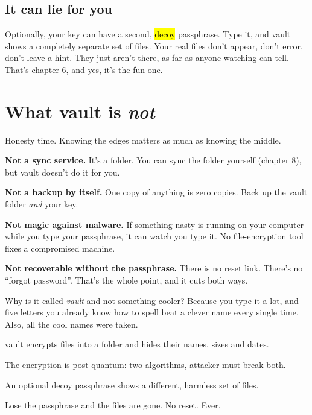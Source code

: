 \documentclass[10pt,oneside,openany]{book}
\begin{document}
\subsection{It can lie for you}
Optionally, your key can have a second, \hl{decoy} passphrase. Type it, and
vault shows a completely separate set of files. Your real files don't appear,
don't error, don't leave a hint. They just aren't there, as far as anyone
watching can tell. That's chapter 6, and yes, it's the fun one.

\section{What vault is \emph{not}}

Honesty time. Knowing the edges matters as much as knowing the middle.

\begin{nopes}
  \item \textbf{Not a sync service.} It's a folder. You can sync the folder
        yourself (chapter 8), but vault doesn't do it for you.
  \item \textbf{Not a backup by itself.} One copy of anything is zero copies.
        Back up the vault folder \emph{and} your key.
  \item \textbf{Not magic against malware.} If something nasty is running on
        your computer while you type your passphrase, it can watch you type
        it. No file-encryption tool fixes a compromised machine.
  \item \textbf{Not recoverable without the passphrase.} There is no reset
        link. There's no ``forgot password''. That's the whole point, and it
        cuts both ways.
\end{nopes}

\begin{squirrel}
Why is it called \emph{vault} and not something cooler? Because you type it a
lot, and five letters you already know how to spell beat a clever name every
single time. Also, all the cool names were taken.
\end{squirrel}

\begin{pocket}
\begin{pocketlist}
  \item vault encrypts files into a folder and hides their names, sizes and dates.
  \item The encryption is post-quantum: two algorithms, attacker must break both.
  \item An optional decoy passphrase shows a different, harmless set of files.
  \item Lose the passphrase and the files are gone. No reset. Ever.
\end{pocketlist}
\end{pocket}
\end{document}
